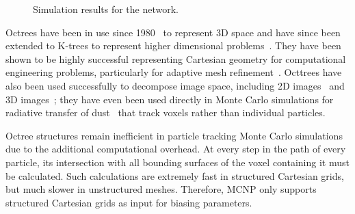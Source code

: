 \documentclass[conference]{IEEEtran}
\begin{document}
\begin{figure}[!t]
\centering
{}
\hfil
{}
\caption{Simulation results for the network.}
\label{fig:treecomp}
\end{figure}

Octrees have been in use since 1980~\cite{ref:jackins1980249} to represent 3D space and have since been extended to K-trees to represent higher dimensional problems~\cite{ref:jackins1983533}. They have been shown to be highly successful representing Cartesian geometry for computational engineering problems, particularly for adaptive mesh refinement~\cite{ref:Linden201558}. Octtrees have also been used successfully to decompose image space, including 2D images~\cite{ref:Lange2004592} and 3D images~\cite{ref:udomchaiporn2013229, ref:Lee2010359}; they have even been used directly in Monte Carlo simulations for radiative transfer of dust~\cite{ref:Saftly2013} that track voxels rather than individual particles.

Octree structures remain inefficient in particle tracking Monte Carlo simulations due to the additional computational overhead. At every step in the path of every particle, its intersection with all bounding surfaces of the voxel containing it must be calculated. Such calculations are extremely fast in structured Cartesian grids, but much slower in unstructured meshes. Therefore, MCNP only supports structured Cartesian grids as input for biasing parameters.
\end{document}
